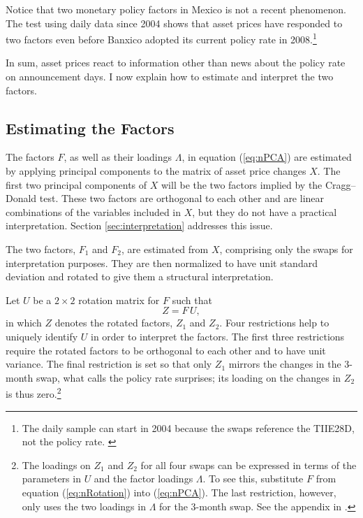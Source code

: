 \documentclass[a4paper, 12pt]{article}
\providecommand{\tiie}{TIIE28D}
\providecommand{\assets}{X}
\providecommand{\factors}{F}
\providecommand{\loadings}{\Lambda}
\providecommand{\rotated}{Z}
\providecommand{\rmatrix}{U}
\providecommand{\rtdone}{\rotated_{1}}
\providecommand{\rtdtwo}{\rotated_{2}}
\newcommand{\eqRotation}{\rotated = \factors \, \rmatrix}
\begin{document}
Notice that two monetary policy factors in Mexico is not a recent phenomenon. 
The test using daily data since 2004 shows that asset prices have responded to two factors even before Banxico adopted its current policy rate in 2008.\footnote{The daily sample can start in 2004 because the swaps reference the \tiie{}, not the policy rate. \label{fn:sampledy}} 

In sum, asset prices react to information other than news about the policy rate on announcement days. 
I now explain how to estimate and interpret the two factors.


\subsection{Estimating the Factors} \label{sec:factors}
The factors \(\factors\), as well as their loadings \(\loadings\), in equation (\ref{eq:nPCA}) are estimated by applying principal components to the matrix of asset price changes \(\assets\). The first two principal components of \(\assets\) will be the two factors implied by the Cragg--Donald test. 
These two factors are orthogonal to each other and are linear combinations of the variables included in \(\assets\), but they do not have a practical interpretation. Section \ref{sec:interpretation} addresses this issue. 

The two factors, \( \factors_{1}\) and \( \factors_{2}\), are estimated from \(\assets\), comprising only the swaps for interpretation purposes. 
They are then normalized to have unit standard deviation and rotated to give them a structural interpretation.

Let \(\rmatrix\) be a \( 2 \times 2 \) rotation matrix for \(\factors\) such that
\begin{equation} \label{eq:nRotation}
	\eqRotation ,
\end{equation}
\noindent in which \(\rotated\) denotes the rotated factors, \(\rtdone\) and \(\rtdtwo\). 
Four restrictions help to uniquely identify \(\rmatrix\) in order to interpret the factors. 
The first three restrictions require the rotated factors to be orthogonal to each other and to have unit variance. 
The final restriction is set so that only \(\rtdone\) mirrors the changes in the 3-month swap, what \textcite{Solis:FX} calls the policy rate surprises; its loading on the changes in \( \rtdtwo \) is thus zero.\footnote{ The loadings on \( \rtdone \) and \( \rtdtwo \) for all four swaps can be expressed in terms of the parameters in \( \rmatrix \) and the factor loadings \( \loadings \). To see this, substitute \( \factors \) from equation (\ref{eq:nRotation}) into (\ref{eq:nPCA}). The last restriction, however, only uses the two loadings in \(\loadings\) for the 3-month swap. See the appendix in \textcite{GSS:2005a}.}
\end{document}
